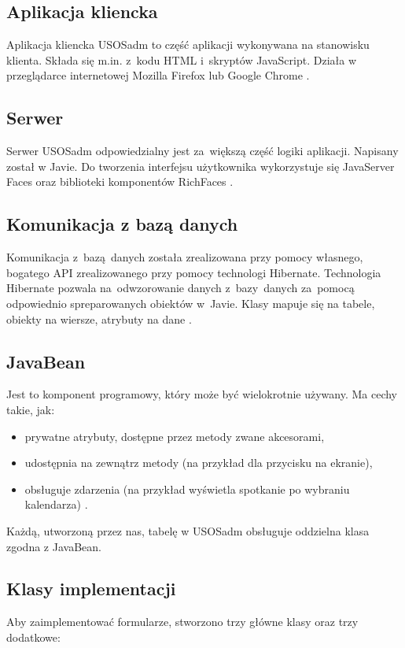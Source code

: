\documentclass[licencjacka]{pracamgr}
\begin{document}
\subsection{Aplikacja kliencka}
Aplikacja kliencka USOSadm to część aplikacji wykonywana na stanowisku klienta. Składa się m.in. z~kodu HTML i~skryptów JavaScript. Działa w przeglądarce internetowej Mozilla Firefox lub Google Chrome \cite{wdr}.

\subsection{Serwer}
Serwer USOSadm odpowiedzialny jest za~większą część logiki aplikacji. Napisany został w Javie. Do tworzenia interfejsu użytkownika wykorzystuje się JavaServer Faces oraz biblioteki komponentów RichFaces \cite{wikijsf}.

\subsection{Komunikacja z bazą danych}
Komunikacja z~bazą~danych została zrealizowana przy pomocy własnego, bogatego API zrealizowanego przy pomocy technologi Hibernate. Technologia Hibernate pozwala na~odwzorowanie danych z~bazy~danych za~pomocą odpowiednio spreparowanych obiektów w~Javie. Klasy mapuje się na tabele, obiekty na wiersze, atrybuty na dane \cite{hibernate}.

\subsection{JavaBean}
Jest to komponent programowy, który może być wielokrotnie używany. Ma cechy takie, jak:
\begin{itemize}
\item prywatne atrybuty, dostępne przez metody zwane akcesorami,
\item udostępnia na zewnątrz metody (na przykład dla przycisku na ekranie),
\item obsługuje zdarzenia (na przykład wyświetla spotkanie po wybraniu kalendarza) \cite{javabean}.
\end{itemize}
Każdą, utworzoną przez nas, tabelę w USOSadm obsługuje oddzielna klasa zgodna z JavaBean.

\subsection{Klasy implementacji}
Aby zaimplementować formularze, stworzono trzy główne klasy oraz trzy dodatkowe:
\end{document}
